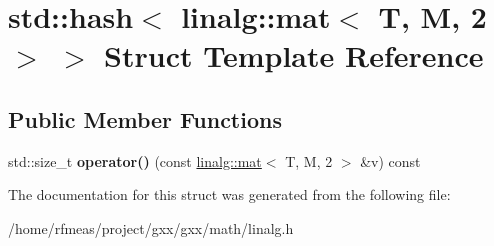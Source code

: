 \hypertarget{structstd_1_1hash_3_01linalg_1_1mat_3_01T_00_01M_00_012_01_4_01_4}{}\section{std\+:\+:hash$<$ linalg\+:\+:mat$<$ T, M, 2 $>$ $>$ Struct Template Reference}
\label{structstd_1_1hash_3_01linalg_1_1mat_3_01T_00_01M_00_012_01_4_01_4}
\subsection*{Public Member Functions}
\begin{DoxyCompactItemize}
\item 
std\+::size\+\_\+t {\bfseries operator()} (const \hyperlink{structlinalg_1_1mat}{linalg\+::mat}$<$ T, M, 2 $>$ \&v) const \hypertarget{structstd_1_1hash_3_01linalg_1_1mat_3_01T_00_01M_00_012_01_4_01_4_ac32250cd83daa5a64d31d9f1fca83821}{}\label{structstd_1_1hash_3_01linalg_1_1mat_3_01T_00_01M_00_012_01_4_01_4_ac32250cd83daa5a64d31d9f1fca83821}

\end{DoxyCompactItemize}


The documentation for this struct was generated from the following file\+:\begin{DoxyCompactItemize}
\item 
/home/rfmeas/project/gxx/gxx/math/linalg.\+h\end{DoxyCompactItemize}
